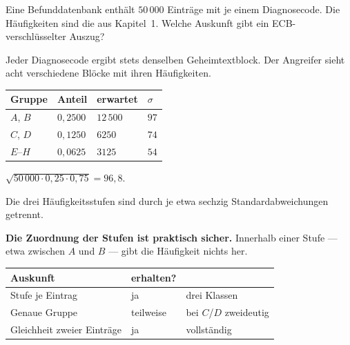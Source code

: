 \begin{aufgabe}
Eine Befunddatenbank enthält $50\,000$ Einträge mit je einem Diagnosecode. Die Häufigkeiten sind die aus Kapitel~1. Welche Auskunft gibt ein ECB-verschlüsselter Auszug?

\loesung
{}
Jeder Diagnosecode ergibt stets denselben Geheimtextblock. Der Angreifer sieht acht verschiedene Blöcke mit ihren Häufigkeiten.

\begin{center}
{\small
\renewcommand{\arraystretch}{1.48}
\begin{tabular}{@{}P{1.8cm}P{1.8cm}P{2.2cm}P{2.0cm}@{}}
\toprule
\textbf{Gruppe} & \textbf{Anteil} & \textbf{erwartet} & $\sigma$\\
\midrule
$A$, $B$ & $0{,}2500$ & $12\,500$ & $97$\\
$C$, $D$ & $0{,}1250$ & $6250$ & $74$\\
$E$--$H$ & $0{,}0625$ & $3125$ & $54$\\
\bottomrule
\end{tabular}}
\end{center}

 $\sqrt{50\,000\cdot0{,}25\cdot0{,}75} = 96{,}8$.

Die drei Häufigkeitsstufen sind durch je etwa sechzig Standardabweichungen getrennt.

\begin{center}
\begin{minipage}{0.9\textwidth}
\textbf{Die Zuordnung der Stufen ist praktisch sicher.} Innerhalb einer Stufe --- etwa zwischen $A$ und $B$ --- gibt die Häufigkeit nichts her.
\end{minipage}
\end{center}

\begin{center}
{\small
\renewcommand{\arraystretch}{1.48}
\begin{tabular}{@{}P{2.6cm}P{2.4cm}P{2.6cm}@{}}
\toprule
\textbf{Auskunft} & \textbf{erhalten?} & \\
\midrule
Stufe je Eintrag & \textcolor{akzent}{ja} & drei Klassen\\
Genaue Gruppe & teilweise & bei $C$/$D$ zweideutig\\
Gleichheit zweier Einträge & \textcolor{akzent}{ja} & vollständig\\
\bottomrule
\end{tabular}}
\end{center}


\end{aufgabe}
